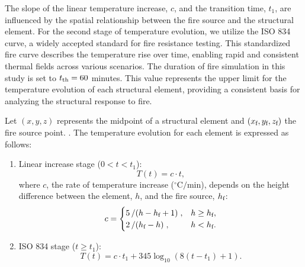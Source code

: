 The slope of the linear temperature increase, $c$, and the transition time, $t_1$, are influenced by the spatial relationship between the fire source and the structural element. For the second stage of temperature evolution, we utilize the ISO 834 curve, a widely accepted standard for fire resistance testing. This standardized fire curve describes the temperature rise over time, enabling rapid and consistent thermal fields across various scenarios. The duration of fire simulation in this study is set to $t_{\text{th}}=60$ minutes. This value represents the upper limit for the temperature evolution of each structural element, providing a consistent basis for analyzing the structural response to fire.

Let $(x, y, z)$ represents the midpoint of a structural element and $(x_{\text{f}}, y_{\text{f}}, z_{\text{f}})$ the fire source point. . The temperature evolution for each element is expressed as follows:
\begin{enumerate}
    \item Linear increase stage ($0 < t < t_1$):
    \begin{equation}
    T(t) = c \cdot t,
    \end{equation}
    where $c$, the rate of temperature increase ($^\circ\mathrm{C}/\mathrm{min}$), depends on the height difference between the element, $h$, and the fire source, $h_{\text{f}}$:
    \begin{equation}
        c = 
        \begin{cases} 
        5\left/\left(h - h_{\text{f}} + 1\right)\right., & h \geq h_{\text{f}}, \\
        2\left/\left(h_{\text{f}} - h\right)\right., & h < h_{\text{f}}.
        \end{cases}
    \end{equation}
     \item ISO 834 stage ($t \geq t_1$):
\begin{equation}
    T(t) = c \cdot t_1 + 345 \log_{10} \left(8 \left(t - t_1\right) + 1\right).
\end{equation}
\end{enumerate}

